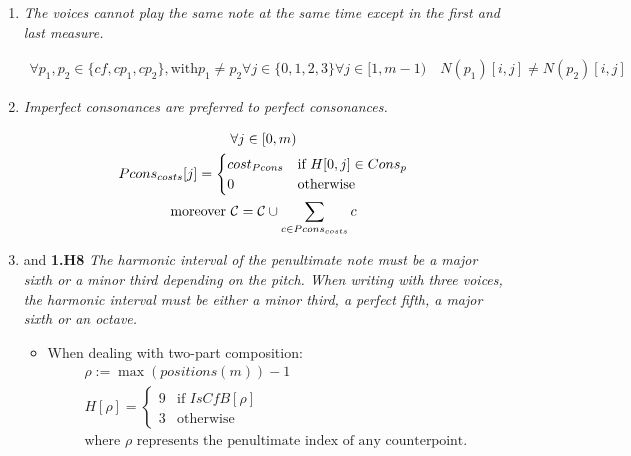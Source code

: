 \begin{enumerate}[wide, label=\bfseries 1.H\arabic*]
\item\label{rule:no-unison-appendix}{\textit{The voices cannot play the same note at the same time except in the first and last measure.}}

\begin{equation}
    \begin{gathered}
        \forall p_1, p_2 \in \{\mathit{cf}, cp_1, cp_2\}, \text{with} p_1 \neq p_2 \forall j \in \{0, 1, 2, 3\} \forall j \in [1, m-1) \quad
        N(p_1)[i, j] \neq N(p_2)[i, j]
    \end{gathered}
\end{equation}

\item \label{rule:prefer-imp-to-perf-appendix}{\textit{Imperfect consonances are preferred to perfect consonances.}}


\begin{equation}
    \begin{gathered}
        \forall j \in [0, m)\\
        Pcons_{costs}[j] = \begin{cases}
            cost_{Pcons} & \text{if } H[0, j] \in Cons_{p}\\
            0 & \text{otherwise}
        \end{cases}\\
        \text{moreover } \mathcal{C} = \mathcal{C} \cup \sum _{c \in Pcons_{costs}} c
    \end{gathered}
\end{equation}

\item{and \textbf{1.H8} \textit{The harmonic interval of the penultimate note must be a major sixth or a minor third depending on the \cfs pitch. When writing with three voices, the harmonic interval must be either a minor third, a perfect fifth, a major sixth or an octave.}}\label{rule:penult-interval-2v}

\addtocounter{enumi}{1} 
\begin{itemize} \item  When dealing with two-part composition:\begin{equation}
    \begin{gathered}
        \rho := \max (positions(m)) - 1\\
        H[\rho] = \begin{cases}
            9 & \text{if } \mathit{IsCfB}[\rho]\\
            3 & \text{otherwise}
        \end{cases}\\
        \text{where } \rho \text{ represents the penultimate index of any counterpoint.}
    \end{gathered}
\end{equation}


\end{itemize}
\end{enumerate}
